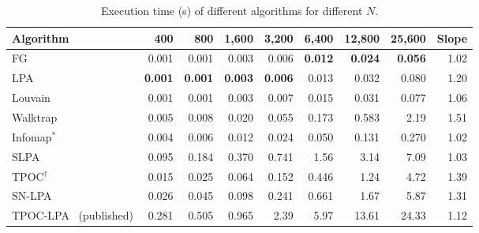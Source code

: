 \documentclass[conference]{IEEEtran}
\begin{document}
\begin{table}[t]
\centering
\caption{Execution time (s) of different algorithms for different $N$.}
\label{tab:lat}
\scriptsize
\begin{tabular}{lrrrrrrrr}
\toprule
Algorithm & 400 & 800 & 1{,}600 & 3{,}200 & 6{,}400 & 12{,}800 & 25{,}600 & Slope \\
\midrule
FG & 0.001 & 0.001 & 0.003 & 0.006 & \textbf{0.012} & \textbf{0.024} & \textbf{0.056} & 1.02 \\
LPA & \textbf{0.001} & \textbf{0.001} & \textbf{0.003} & \textbf{0.006} & 0.013 & 0.032 & 0.080 & 1.20 \\
Louvain & 0.001 & 0.001 & 0.003 & 0.007 & 0.015 & 0.031 & 0.077 & 1.06 \\
Walktrap & 0.005 & 0.008 & 0.020 & 0.055 & 0.173 & 0.583 & 2.19 & 1.51 \\
Infomap$^{*}$ & 0.004 & 0.006 & 0.012 & 0.024 & 0.050 & 0.131 & 0.270 & 1.02 \\
SLPA & 0.095 & 0.184 & 0.370 & 0.741 & 1.56 & 3.14 & 7.09 & 1.03 \\
TPOC$^{\dagger}$ & 0.015 & 0.025 & 0.064 & 0.152 & 0.446 & 1.24 & 4.72 & 1.39 \\
SN-LPA & 0.026 & 0.045 & 0.098 & 0.241 & 0.661 & 1.67 & 5.87 & 1.31 \\
\midrule
TPOC-LPA~\cite{kong2026} (published) & 0.281 & 0.505 & 0.965 & 2.39 & 5.97 & 13.61 & 24.33 & 1.12 \\
\bottomrule
\end{tabular}
\end{table}
\end{document}

